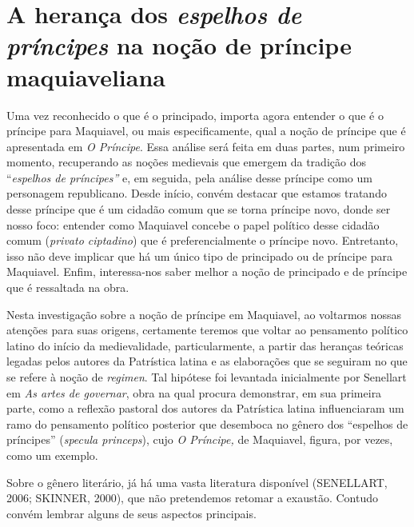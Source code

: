 \section{A herança dos \emph{espelhos de príncipes} na noção de príncipe maquiaveliana}

Uma vez reconhecido o que é o principado, importa agora entender o que é
o príncipe para Maquiavel, ou mais especificamente, qual a noção de
príncipe que é apresentada em \emph{O Príncipe}. Essa análise será feita
em duas partes, num primeiro momento, recuperando as noções medievais
que emergem da tradição dos ``\emph{espelhos de príncipes''} e, em
seguida, pela análise desse príncipe como um personagem republicano.
Desde início, convém destacar que estamos tratando desse príncipe que é
um cidadão comum que se torna príncipe novo, donde ser nosso foco:
entender como Maquiavel concebe o papel político desse cidadão comum
(\emph{privato ciptadino}) que é preferencialmente o príncipe novo.
Entretanto, isso não deve implicar que há um único tipo de principado ou
de príncipe para Maquiavel. Enfim, interessa-nos saber melhor a noção de
principado e de príncipe que é ressaltada na obra.

Nesta investigação sobre a noção de príncipe em Maquiavel, ao voltarmos
nossas atenções para suas origens, certamente teremos que voltar ao
pensamento político latino do início da medievalidade, particularmente,
a partir das heranças teóricas legadas pelos autores da Patrística
latina e as elaborações que se seguiram no que se refere à noção de
\emph{regimen}. Tal hipótese foi levantada inicialmente por Senellart em
\emph{As artes de governar}, obra na qual procura demonstrar, em sua
primeira parte, como a reflexão pastoral dos autores da Patrística
latina influenciaram um ramo do pensamento político posterior que
desemboca no gênero dos ``espelhos de príncipes'' (\emph{specula
princeps}), cujo \emph{O Príncipe,} de Maquiavel, figura, por vezes,
como um exemplo.

Sobre o gênero literário, já há uma vasta literatura disponível
(SENELLART, 2006; SKINNER, 2000), que não pretendemos retomar a
exaustão. Contudo convém lembrar alguns de seus aspectos principais.

